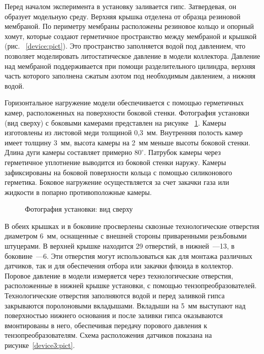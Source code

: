 Перед началом эксперимента в установку заливается гипс. Затвердевая, он образует модельную среду. Верхняя крышка отделена от образца резиновой мембраной. По периметру мембраны расположены резиновое кольцо и опорный хомут, которые создают герметичное пространство между мембраной и крышкой (рис. ~\ref{device:pict}). Это пространство заполняется водой под давлением, что позволяет моделировать литостатическое давление в модели коллектора. Давление над мембраной поддерживается при помощи разделительного цилиндра, верхняя часть которого заполнена сжатым азотом под необходимым давлением, а нижняя водой. 

Горизонтальное нагружение модели обеспечивается с помощью герметичных камер, расположенных на поверхности боковой стенки. Фотография установки (вид сверху) с боковыми камерами представлен на рисунке ~\ref{device2:pict}. Камеры изготовлены из листовой меди толщиной 0,3~мм. Внутренняя полость камер имеет толщину 3~мм, высота камеры на 2~мм меньше высоты боковой стенки. Длина дуги камеры составляет примерно $80^\circ$. Патрубок камеры через герметичное уплотнение выводится из боковой стенки наружу. Камеры зафиксированы на боковой поверхности кольца с помощью силиконового герметика. Боковое нагружение осуществляется за счет закачки газа или жидкости в попарно противоположные камеры.

\begin{figure}[hb]
\begin{center}
\end{center}
\caption{Фотография установки: вид сверху}\label{device2:pict}
\end{figure}

В обеих крышках и в боковине просверлены сквозные технологические отверстия диаметром 6~мм, оснащенные с внешней стороны приваренными резьбовыми штуцерами. В верхней крышке находится 29 отверстий, в нижней~---13, в боковине~---6. Эти отверстия могут использоваться как для монтажа различных датчиков, так и для обеспечения отбора или закачки флюида в коллектор. Поровое давление в модели измеряется через технологические отверстия, расположенные в нижней крышке установки, с помощью тензопреобразователей. Технологические отверстия заполняются водой и перед заливкой гипса закрываются поролоновыми вкладышами. Вкладыши на 5~мм выступают над поверхностью нижнего основания и после заливки гипса оказываются вмонтированы в него, обеспечивая передачу порового давления к тензопреобразователям. Схема расположения датчиков показана на рисунке~\ref{device3:pict}.

